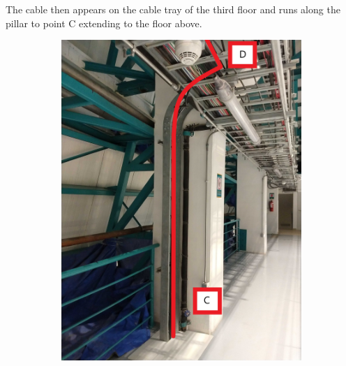 The cable then appears on the cable tray of the third floor and runs along the pillar to point C extending to the floor above.

\begin{figure}
  \centering
  \begin{subfigure}{0.45\textwidth}
    \centering
    \includegraphics[width=\textwidth]{images/14.jpg}
  \end{subfigure}
  \hfill
  \begin{subfigure}{0.45\textwidth}
    \centering

\end{subfigure}
\end{figure}
